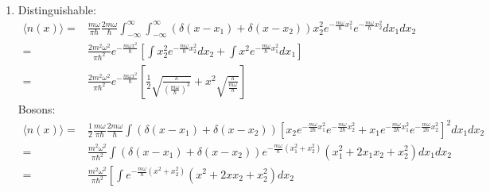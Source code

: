 \begin{enumerate}
\begin{align*}
        \end{align*}
        \begin{align*}
            P(|r|)
            =&
            \frac{2m^2\omega^2}{\pi\hbar^2}
        e^{-\frac{m\omega r^2}{2\hbar}}
        r^2
        \int_{-\infty}^{\infty}
        e^{-\frac{m\omega}{\hbar}2R^2}dR\\
        =&
        \frac{2m^2\omega^2}{\pi\hbar^2}
        e^{-\frac{m\omega r^2}{2\hbar}}
        r^2
        \sqrt{\frac{\pi}{\frac{2m\omega}{\hbar}}}
        \end{align*}
    \item 
    Distinguishable:
    \begin{align*}
        \langle n(x)\rangle
        =&
        \frac{m\omega}{\pi\hbar}
        \frac{2m\omega}{\hbar}
        \int_{-\infty}^{\infty}\int_{-\infty}^{\infty}
        (\delta(x-x_1)+\delta(x-x_2))
        x_2^2
        e^{-\frac{m\omega}{\hbar}x_1^2}
        e^{-\frac{m\omega}{\hbar}x_2^2}dx_1dx_2\\
        =&
        \frac{2m^2\omega^2}{\pi\hbar^2}
        e^{-\frac{m\omega x^2}{\hbar}}
        \left[\int
        x_2^2e^{-\frac{m\omega}{\hbar}x_2^2}
        dx_2
        +
        \int
        x^2e^{-\frac{m\omega}{\hbar}x_1^2}
        dx_1
        \right]
        \\
        =&
        \frac{2m^2\omega^2}{\pi\hbar^2}
        e^{-\frac{m\omega x^2}{\hbar}}
        \left[
        \frac{1}{2}
        \sqrt{\frac{\pi}{(\frac{m\omega}{\hbar})^3}}
        +x^2
        \sqrt{\frac{\pi}{\frac{m\omega}{\hbar}}}
        \right]
    \end{align*}
    Bosons:
    \begin{align*}
        \langle n(x)\rangle=&
        \frac{1}{2}
        \frac{m\omega}{\pi\hbar}
        \frac{2m\omega}{\hbar}
        \int
        (\delta(x-x_1)+\delta(x-x_2))
        \left[
        x_2
        e^{-\frac{m\omega}{2\hbar}x_1^2}
        e^{-\frac{m\omega}{2\hbar}x_2^2}
        +
        x_1
        e^{-\frac{m\omega}{2\hbar}x_1^2}
        e^{-\frac{m\omega}{2\hbar}x_2^2}
        \right]^2dx_1dx_2\\
        =&
        \frac{m^2\omega^2}{\pi\hbar^2}
        \int
        (\delta(x-x_1)+\delta(x-x_2))e^{-\frac{m\omega}{\hbar}(x_1^2+x_2^2)}
        (x_1^2+2x_1x_2+x_2^2)dx_1dx_2\\
        =&
        \frac{m^2\omega^2}{\pi\hbar^2}
        \left[
        \int 
        e^{-\frac{m\omega}{\hbar}(x^2+x_2^2)}
        (x^2+2xx_2+x_2^2)dx_2

\end{align*}
\end{enumerate}
